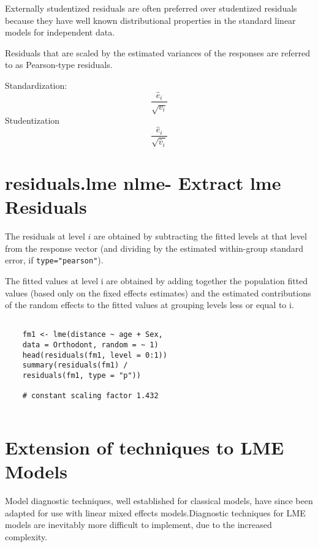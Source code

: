 \documentclass[Main.tex]{subfiles}
\begin{document}
Externally studentized residuals are often preferred over studentized residuals because they have well known distributional
properties in the standard linear models for independent data.

Residuals that are scaled by the estimated variances of the responses are referred to as Pearson-type residuals.

Standardization: \[ \frac{\hat{e}_i}{\sqrt{v_i}}\]
Studentization \[ \frac{\hat{e}_i}{\sqrt{\hat{v}_i}}\]






\section{residuals.lme {nlme}- Extract lme Residuals}

The residuals at level $i$ are obtained by subtracting the fitted levels at that level from the response vector (and dividing by the estimated within-group standard error, if \texttt{type="pearson"}). 

The fitted values at level i are obtained by adding together the population fitted values (based only on the fixed effects estimates) and the estimated contributions of the random effects to the fitted values at grouping levels less or equal to i.


\begin{framed}
	\begin{verbatim}
	
	fm1 <- lme(distance ~ age + Sex, 
	data = Orthodont, random = ~ 1)
	head(residuals(fm1, level = 0:1))
	summary(residuals(fm1) /
	residuals(fm1, type = "p")) 
	
	# constant scaling factor 1.432
	
	\end{verbatim}
\end{framed}


\section{Extension of techniques to LME Models} %

Model diagnostic techniques, well established for classical models, have since been adapted for use with linear mixed effects models.Diagnostic techniques for LME models are inevitably more difficult to implement, due to the increased complexity.
\end{document}
